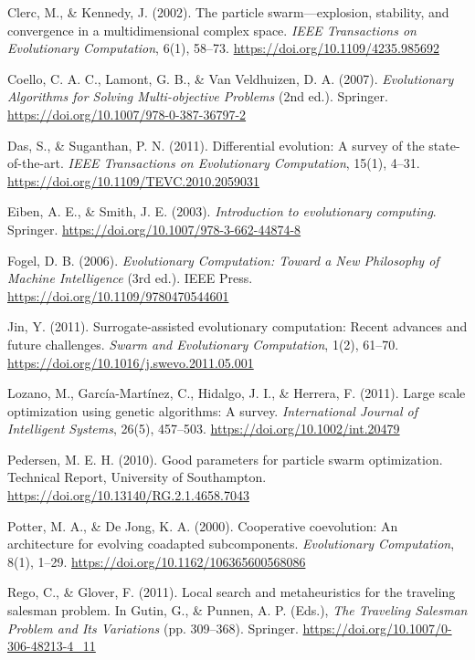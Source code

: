 \documentclass[conference]{IEEEtran}
\begin{document}
\begin{thebibliography}{99}
Clerc, M., \& Kennedy, J. (2002). The particle swarm—explosion, stability, and convergence in a multidimensional complex space. \textit{IEEE Transactions on Evolutionary Computation}, 6(1), 58–73. \url{https://doi.org/10.1109/4235.985692}

Coello, C. A. C., Lamont, G. B., \& Van Veldhuizen, D. A. (2007). \textit{Evolutionary Algorithms for Solving Multi-objective Problems} (2nd ed.). Springer. \url{https://doi.org/10.1007/978-0-387-36797-2}

Das, S., \& Suganthan, P. N. (2011). Differential evolution: A survey of the state-of-the-art. \textit{IEEE Transactions on Evolutionary Computation}, 15(1), 4–31. \url{https://doi.org/10.1109/TEVC.2010.2059031}

Eiben, A. E., \& Smith, J. E. (2003). \textit{Introduction to evolutionary computing}. Springer. \url{https://doi.org/10.1007/978-3-662-44874-8}

Fogel, D. B. (2006). \textit{Evolutionary Computation: Toward a New Philosophy of Machine Intelligence} (3rd ed.). IEEE Press. \url{https://doi.org/10.1109/9780470544601}

Jin, Y. (2011). Surrogate-assisted evolutionary computation: Recent advances and future challenges. \textit{Swarm and Evolutionary Computation}, 1(2), 61–70. \url{https://doi.org/10.1016/j.swevo.2011.05.001}

Lozano, M., García-Martínez, C., Hidalgo, J. I., \& Herrera, F. (2011). Large scale optimization using genetic algorithms: A survey. \textit{International Journal of Intelligent Systems}, 26(5), 457–503. \url{https://doi.org/10.1002/int.20479}

Pedersen, M. E. H. (2010). Good parameters for particle swarm optimization. Technical Report, University of Southampton. \url{https://doi.org/10.13140/RG.2.1.4658.7043}

Potter, M. A., \& De Jong, K. A. (2000). Cooperative coevolution: An architecture for evolving coadapted subcomponents. \textit{Evolutionary Computation}, 8(1), 1–29. \url{https://doi.org/10.1162/106365600568086}

Rego, C., \& Glover, F. (2011). Local search and metaheuristics for the traveling salesman problem. In Gutin, G., \& Punnen, A. P. (Eds.), \textit{The Traveling Salesman Problem and Its Variations} (pp. 309–368). Springer. \url{https://doi.org/10.1007/0-306-48213-4_11}


\end{thebibliography}
\end{document}
